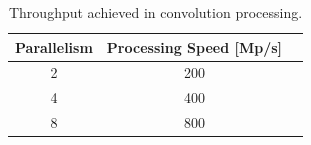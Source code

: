 \documentclass[conference,compsoc]{IEEEtran}
\begin{document}
\begin{table}[!t]
\renewcommand{\arraystretch}{1.3}
\caption{Throughput achieved in convolution processing.}
\label{conv_tp}
\centering
\begin{tabular}{|c|c|c|}
 \hline
  \textbf{Parallelism}  &    \textbf{Processing Speed [Mp/s]}  \\ \hline
          2             &                     200              \\ \hline
          4             &                     400              \\ \hline
          8             &                     800              \\ \hline
\end{tabular}           
\end{table}
\end{document}
